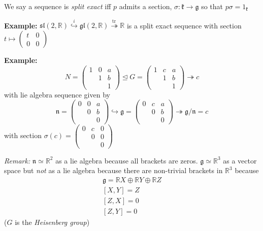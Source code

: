 \documentclass[12pt]{article}
\newcommand{\R}{\mathbb{R}}
\newcommand{\tr}{\text{tr}\,}
\newcommand{\g}{\mathfrak{g}}
\newcommand{\slf}{\mathfrak{sl}}
\newcommand{\glf}{\mathfrak{gl}}
\begin{document}
    We say a sequence is \emph{split exact} iff $p$ admits a section, $\sigma: \mathfrak{k} \to \g$ so that $p\sigma = 1_{\mathfrak{k}}$  

    \textbf{Example:} $\slf(2, \R) \overset{i}{\hookrightarrow} \glf(2, \R) \overset{\tr}{\twoheadrightarrow} \R$ is a split exact sequence with section $t \mapsto \begin{pmatrix}
        t & 0\\ 
        0 & 0
    \end{pmatrix}$ 

    \textbf{Example:} 
    \[N = \begin{pmatrix}
        1 & 0 & a\\ 
        & 1 & b\\ 
        & & 1
    \end{pmatrix} \trianglelefteq G = \begin{pmatrix}
        1 & c & a\\ 
        & 1 & b\\ 
        & & 1
    \end{pmatrix} \twoheadrightarrow c\] 
    with lie algebra sequence given by 
    \[\mathfrak{n} = \begin{pmatrix}
        0 & 0 & a\\ 
        & 0 & b\\ 
        & & 0
    \end{pmatrix} \hookrightarrow \g = \begin{pmatrix}
        0 & c & a\\ 
        & 0 & b\\ 
        & & 0
    \end{pmatrix} \twoheadrightarrow \g/\mathfrak{n} = c\] 
    with section $\sigma(c) = \begin{pmatrix}
        0 & c & 0\\ 
        & 0 & 0\\ 
        & & 0
    \end{pmatrix}$  
    
    \emph{Remark:} $\mathfrak{n} \simeq \R^2$ as a lie algebra because all brackets are zeros. $\mathfrak{g} \simeq \R^3$ as a vector space but \emph{not} as a lie algebra because there are non-trivial brackets in $\R^3$ because 
    \begin{gather*}
        \g = \R X \oplus \R Y \oplus \R Z\\ 
        [X, Y] = Z\\
        [Z, X] = 0\\ 
        [Z, Y] = 0
    \end{gather*}
    ($G$ is the \emph{Heisenberg group}) 
\end{document}
